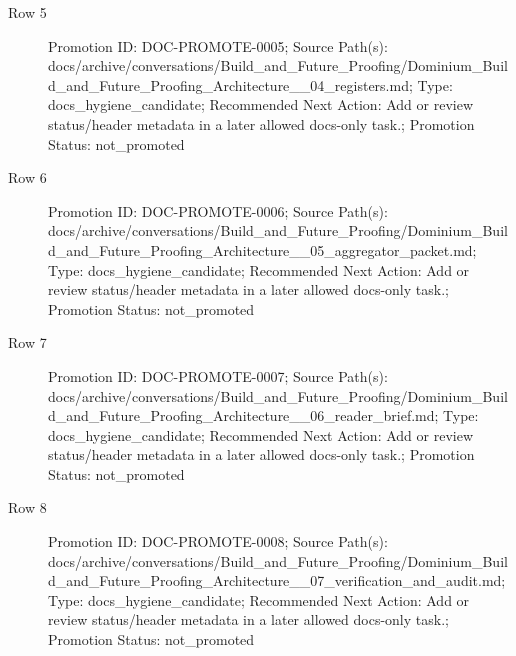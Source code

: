 \documentclass[9pt,a4paper,openany]{book}
\begin{document}
\begin{description}
\item[Row 5] Promotion ID: DOC-\allowbreak{}PROMOTE-\allowbreak{}0005; Source Path(s): docs/\allowbreak{}archive/\allowbreak{}conversations/\allowbreak{}Build\_\allowbreak{}and\_\allowbreak{}Future\_\allowbreak{}Proofing/\allowbreak{}Dominium\_\allowbreak{}Build\_\allowbreak{}and\_\allowbreak{}Future\_\allowbreak{}Proofing\_\allowbreak{}Architecture\_\allowbreak{}\_\allowbreak{}04\_\allowbreak{}registers.\allowbreak{}md; Type: docs\_\allowbreak{}hygiene\_\allowbreak{}candidate; Recommended Next Action: Add or review status/\allowbreak{}header metadata in a later allowed docs-\allowbreak{}only task.\allowbreak{}; Promotion Status: not\_\allowbreak{}promoted
\item[Row 6] Promotion ID: DOC-\allowbreak{}PROMOTE-\allowbreak{}0006; Source Path(s): docs/\allowbreak{}archive/\allowbreak{}conversations/\allowbreak{}Build\_\allowbreak{}and\_\allowbreak{}Future\_\allowbreak{}Proofing/\allowbreak{}Dominium\_\allowbreak{}Build\_\allowbreak{}and\_\allowbreak{}Future\_\allowbreak{}Proofing\_\allowbreak{}Architecture\_\allowbreak{}\_\allowbreak{}05\_\allowbreak{}aggregator\_\allowbreak{}packet.\allowbreak{}md; Type: docs\_\allowbreak{}hygiene\_\allowbreak{}candidate; Recommended Next Action: Add or review status/\allowbreak{}header metadata in a later allowed docs-\allowbreak{}only task.\allowbreak{}; Promotion Status: not\_\allowbreak{}promoted
\item[Row 7] Promotion ID: DOC-\allowbreak{}PROMOTE-\allowbreak{}0007; Source Path(s): docs/\allowbreak{}archive/\allowbreak{}conversations/\allowbreak{}Build\_\allowbreak{}and\_\allowbreak{}Future\_\allowbreak{}Proofing/\allowbreak{}Dominium\_\allowbreak{}Build\_\allowbreak{}and\_\allowbreak{}Future\_\allowbreak{}Proofing\_\allowbreak{}Architecture\_\allowbreak{}\_\allowbreak{}06\_\allowbreak{}reader\_\allowbreak{}brief.\allowbreak{}md; Type: docs\_\allowbreak{}hygiene\_\allowbreak{}candidate; Recommended Next Action: Add or review status/\allowbreak{}header metadata in a later allowed docs-\allowbreak{}only task.\allowbreak{}; Promotion Status: not\_\allowbreak{}promoted
\item[Row 8] Promotion ID: DOC-\allowbreak{}PROMOTE-\allowbreak{}0008; Source Path(s): docs/\allowbreak{}archive/\allowbreak{}conversations/\allowbreak{}Build\_\allowbreak{}and\_\allowbreak{}Future\_\allowbreak{}Proofing/\allowbreak{}Dominium\_\allowbreak{}Build\_\allowbreak{}and\_\allowbreak{}Future\_\allowbreak{}Proofing\_\allowbreak{}Architecture\_\allowbreak{}\_\allowbreak{}07\_\allowbreak{}verification\_\allowbreak{}and\_\allowbreak{}audit.\allowbreak{}md; Type: docs\_\allowbreak{}hygiene\_\allowbreak{}candidate; Recommended Next Action: Add or review status/\allowbreak{}header metadata in a later allowed docs-\allowbreak{}only task.\allowbreak{}; Promotion Status: not\_\allowbreak{}promoted

\end{description}
\end{document}

